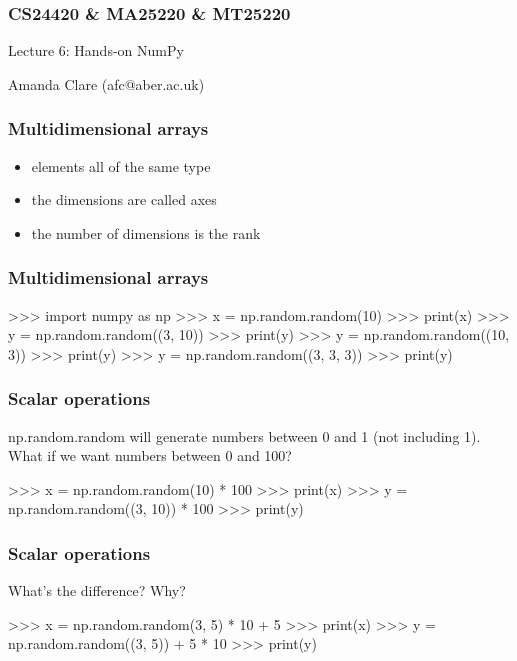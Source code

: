 \documentclass{beamer}
\begin{document}

\begin{frame}
\frametitle{CS24420 \& MA25220 \& MT25220}

\begin{center}
\begin{huge}
Lecture 6: Hands-on NumPy
\end{huge}
\bigskip

Amanda Clare (afc@aber.ac.uk)

\end{center}
\end{frame}


\begin{frame}[fragile]
\frametitle{Multidimensional arrays}
\begin{itemize}
\item elements all of the same type
\item the dimensions are called axes
\item the number of dimensions is the rank 
\end{itemize}

\end{frame}

\begin{frame}[fragile]
\frametitle{Multidimensional arrays}
\begin{code}
>>> import numpy as np
>>> x = np.random.random(10)
>>> print(x)
>>> y = np.random.random((3, 10))
>>> print(y)
>>> y = np.random.random((10, 3))
>>> print(y)
>>> y = np.random.random((3, 3, 3))
>>> print(y)
\end{code}
\end{frame}

\begin{frame}[fragile]
\frametitle{Scalar operations}

np.random.random will generate numbers between 0 and 1 (not including
1). What if we want numbers between 0 and 100?
\begin{code}
>>> x = np.random.random(10) * 100
>>> print(x)
>>> y = np.random.random((3, 10)) * 100
>>> print(y)
\end{code}
\end{frame}

\begin{frame}[fragile]
\frametitle{Scalar operations}

What's the difference? Why?
\begin{code}
>>> x = np.random.random(3, 5) * 10 + 5
>>> print(x)
>>> y = np.random.random((3, 5)) + 5 * 10
>>> print(y)
\end{code}
\end{frame}
\end{document}
